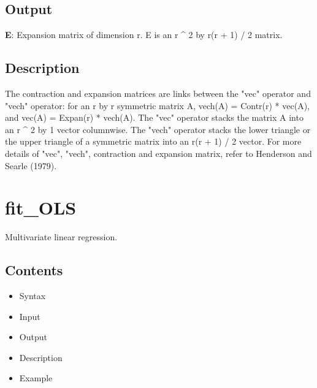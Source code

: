 \documentclass[a4paper,11pt,openany]{memoir}
\begin{document}
\subsection*{Output}

\begin{par}
\textbf{E}: Expansion matrix of dimension r.  E is an r \^{} 2 by r(r + 1) / 2 matrix.
\end{par} \vspace{1em}


\subsection*{Description}

\begin{par}
The contraction and expansion matrices are links between the "vec" operator and "vech" operator: for an r by r symmetric matrix A, vech(A) = Contr(r) * vec(A), and vec(A) = Expan(r) * vech(A). The "vec" operator stacks the matrix A into an r \^{} 2 by 1 vector columnwise.  The "vech" operator stacks the lower triangle or the upper triangle of a symmetric matrix into an r(r + 1) / 2 vector. For more details of "vec", "vech", contraction and expansion matrix, refer to Henderson and Searle (1979).
\end{par} \vspace{1em}

\newpage

\rmfamily
\color{black}\section{fit\_OLS}

\begin{par}
Multivariate linear regression.
\end{par} \vspace{1em}

\subsection*{Contents}

\begin{itemize}
\setlength{\itemsep}{-1ex}
   \item Syntax
   \item Input
   \item Output
   \item Description
   \item Example
\end{itemize}
\end{document}
